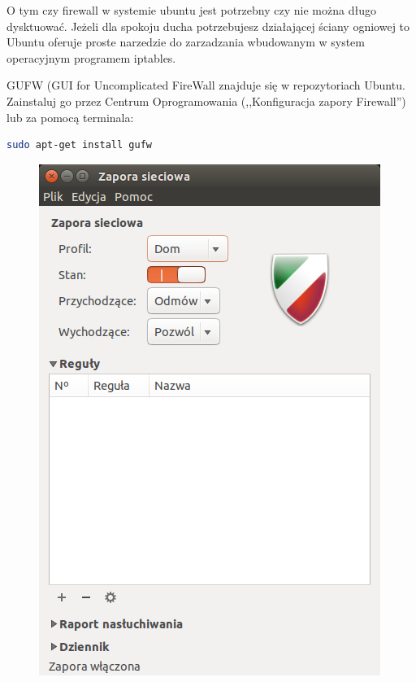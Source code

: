O tym czy firewall w systemie ubuntu jest potrzebny czy nie można długo dysktuować. Jeżeli dla spokoju ducha potrzebujesz działającej ściany ogniowej to Ubuntu oferuje proste narzedzie do zarzadzania wbudowanym w system operacyjnym programem iptables.

GUFW (\textcolor{ubuntu_orange}{GUI for Uncomplicated FireWall} znajduje się w repozytoriach Ubuntu. Zainstaluj go przez Centrum Oprogramowania (,,Konfiguracja zapory Firewall'') lub za pomocą terminala:
\begin{lstlisting}[language=bash]
sudo apt-get install gufw
\end{lstlisting}

\begin{figure}
	\vspace{-10pt}
	\includegraphics[width=\linewidth]{images/programy_gufw.png}
\end{figure}

